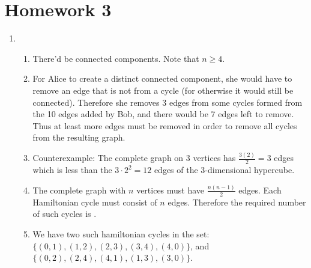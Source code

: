 \section{Homework 3}
\begin{enumerate}
\setlength{\parskip}{8pt}
\item
    \begin{enumerate}
        \setlength{\parskip}{8pt}
        \item There'd be  connected components. Note that $n\geq 4$.
        \item For Alice to create a distinct connected component, she would have to remove an edge that is not from a cycle (for otherwise it would still be connected). Therefore she removes 3 edges from some cycles formed from the 10 edges added by Bob, and there would be 7 edges left to remove. Thus at least  more edges must be removed in order to remove all cycles from the resulting graph.
        \item {} Counterexample: The complete graph on 3 vertices has $\frac{3(2)}{2}=3$ edges which is less than the $3\cdot2^2=12$ edges of the 3-dimensional hypercube.
        \item The complete graph with $n$ vertices must have $\frac{n(n-1)}{2}$ edges. Each Hamiltonian cycle must consist of $n$ edges. Therefore the required number of such cycles is .
    \item We have two such hamiltonian cycles in the set: $\{(0, 1),(1, 2),(2, 3),(3, 4),(4, 0)\}$, and $\{(0, 2),(2, 4),(4, 1),(1, 3),(3, 0)\}$.
    \end{enumerate}
    

\end{enumerate}
